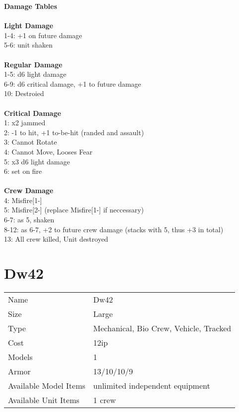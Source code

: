 {\bf Damage Tables} \\
\ \\ {\bf Light Damage } \\
1-4: +1 on future damage \\
5-6: unit shaken \\
\ \\ {\bf Regular Damage } \\
1-5: d6 light damage \\
6-9: d6 critical damage, +1 to future damage \\
10: Destroied \\
\ \\ {\bf Critical Damage } \\
1: x2 jammed \\
2: -1 to hit, +1 to-be-hit (randed and assault) \\
3: Cannot Rotate \\
4: Cannot Move, Looses Fear \\
5: x3 d6 light damage \\
6: set on fire \\
\ \\ {\bf Crew Damage } \\
4: Misfire[1-] \\
5: Misfire[2-] (replace Misfire[1-] if neccessary) \\
6-7: as 5, shaken \\
8-12: as 6-7, +2 to future crew damage (stacks with 5, thus +3 in total) \\
13: All crew killed, Unit destroyed \\









\pagebreak

\section{ Dw42 }

\begin{tabular}{ll}
  Name & Dw42 \\
  Size & Large\\
  Type & Mechanical, Bio Crew, Vehicle, Tracked\\
  Cost & 12ip\\
  Models & 1\\
  Armor & 13/10/10/9\\
  Available Model Items & unlimited independent equipment \\
  Available Unit Items & 1 crew \\
\end{tabular}


